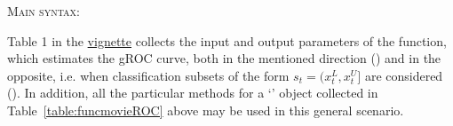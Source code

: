 \textsc{Main syntax:} \par \hspace{3mm}
 \hspace{8mm} 

\noindent Table 1 in the \href{https://cran.r-project.org/web/packages/movieROC/vignettes/movieROC_vignette.pdf}{vignette} collects the input and output parameters of the  function, which estimates the gROC curve, both in the mentioned direction () and in the opposite, i.e. when classification subsets of the form $s_t=(x_t^L, x_t^U]$ are considered (). In addition, all the particular methods for a  `' object collected in Table~\ref{table:funcmovieROC} above may be used in this general scenario.

